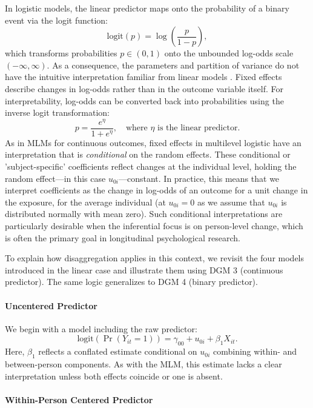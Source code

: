In logistic models, the linear predictor maps onto the probability of a binary event via the logit function:
\[
\text{logit}(p) = \log\left(\frac{p}{1 - p}\right),
\]
which transforms probabilities \( p \in (0, 1) \) onto the unbounded log-odds scale \( (-\infty, \infty) \). As a consequence, the parameters and partition of variance do not have the intuitive interpretation familiar from linear models \parencite{merlo_brief_2006}. Fixed effects describe changes in log-odds rather than in the outcome variable itself. For interpretability, log-odds can be converted back into probabilities using the inverse logit transformation:
\[
p = \frac{e^{\eta}}{1 + e^{\eta}}, \quad \text{where } \eta \text{ is the linear predictor}.
\]
As in MLMs for continuous outcomes, fixed effects in multilevel logistic have an interpretation that is \textit{conditional} on the random effects. These conditional or 'subject-specific' coefficients reflect changes at the individual level, holding the random effect---in this case $u_{0i}$---constant. In practice, this means that we interpret coefficients as the change in log-odds of an outcome for a unit change in the exposure, for the average individual (at $u_{0i} = 0$ as we assume that $u_{0i}$ is distributed normally with mean zero). Such conditional interpretations are particularly desirable when the inferential focus is on person-level change, which is often the primary goal in longitudinal psychological research.

To explain how disaggregation applies in this context, we revisit the four models introduced in the linear case and illustrate them using DGM 3 (continuous predictor). The same logic generalizes to DGM 4 (binary predictor).

\paragraph{Uncentered Predictor}

We begin with a model including the raw predictor:
\begin{equation}
    \label{eqn:M1-logit}
\text{logit}(\Pr(Y_{it} = 1)) = \gamma_{00} + u_{0i} + \beta_1 X_{it}.
\end{equation}
Here, \( \beta_1 \) reflects a conflated estimate conditional on $u_{0i}$ combining within- and between-person components. As with the MLM, this estimate lacks a clear interpretation unless both effects coincide or one is absent.

\paragraph{Within-Person Centered Predictor}

